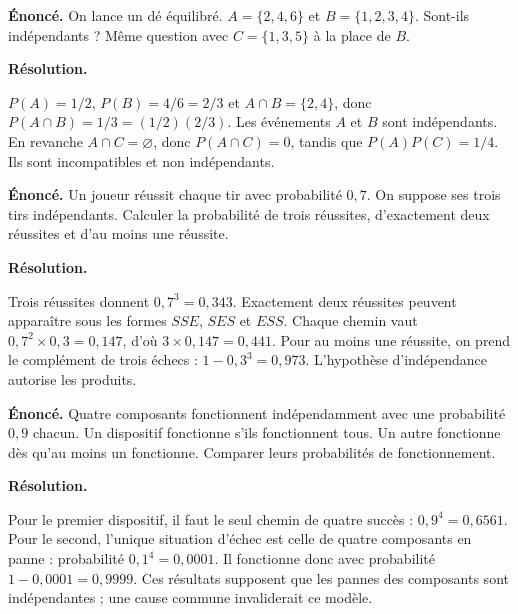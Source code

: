 \documentclass[11pt,a4paper]{article}
\begin{document}
\par\noindent\begin{minipage}{\linewidth}
{\small\color{Muted}\textbf{Énoncé.} On lance un dé équilibré. $A=\{2,4,6\}$ et $B=\{1,2,3,4\}$. Sont-ils indépendants ? Même question avec $C=\{1,3,5\}$ à la place de $B$.}
\par\medskip
\textbf{Résolution.}\par
$P(A)=1/2$, $P(B)=4/6=2/3$ et $A\cap B=\{2,4\}$, donc $P(A\cap B)=1/3=(1/2)(2/3)$. Les événements $A$ et $B$ sont indépendants. En revanche $A\cap C=\varnothing$, donc $P(A\cap C)=0$, tandis que $P(A)P(C)=1/4$. Ils sont incompatibles et non indépendants.
\end{minipage}\par
\par\noindent\begin{minipage}{\linewidth}
{\small\color{Muted}\textbf{Énoncé.} Un joueur réussit chaque tir avec probabilité $0,7$. On suppose ses trois tirs indépendants. Calculer la probabilité de trois réussites, d’exactement deux réussites et d’au moins une réussite.}
\par\medskip
\textbf{Résolution.}\par
Trois réussites donnent $0,7^3=0,343$. Exactement deux réussites peuvent apparaître sous les formes $SSE$, $SES$ et $ESS$. Chaque chemin vaut $0,7^2\times0,3=0,147$, d’où $3\times0,147=0,441$. Pour au moins une réussite, on prend le complément de trois échecs : $1-0,3^3=0,973$. L’hypothèse d’indépendance autorise les produits.
\end{minipage}\par
\par\noindent\begin{minipage}{\linewidth}
{\small\color{Muted}\textbf{Énoncé.} Quatre composants fonctionnent indépendamment avec une probabilité $0,9$ chacun. Un dispositif fonctionne s’ils fonctionnent tous. Un autre fonctionne dès qu’au moins un fonctionne. Comparer leurs probabilités de fonctionnement.}
\par\medskip
\textbf{Résolution.}\par
Pour le premier dispositif, il faut le seul chemin de quatre succès : $0,9^4=0,6561$. Pour le second, l’unique situation d’échec est celle de quatre composants en panne : probabilité $0,1^4=0,0001$. Il fonctionne donc avec probabilité $1-0,0001=0,9999$. Ces résultats supposent que les pannes des composants sont indépendantes ; une cause commune invaliderait ce modèle.
\end{minipage}\par
\end{document}

